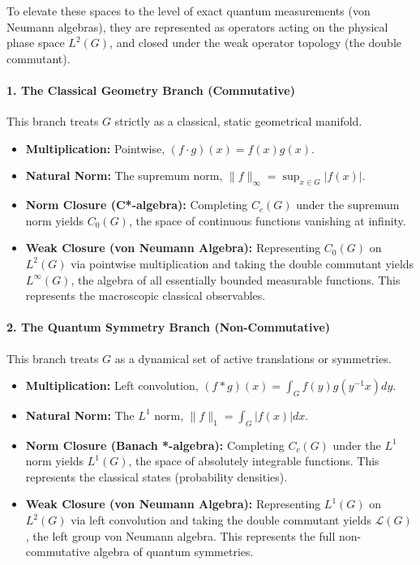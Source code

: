 \documentclass[11pt]{article}
\begin{document}
To elevate these spaces to the level of exact quantum measurements (von Neumann algebras), they are represented as operators acting on the physical phase space $L^2(G)$, and closed under the weak operator topology (the double commutant).

\paragraph{1. The Classical Geometry Branch (Commutative)}
This branch treats $G$ strictly as a classical, static geometrical manifold.
\begin{itemize}
    \item \textbf{Multiplication:} Pointwise, $(f \cdot g)(x) = f(x)g(x)$.
    \item \textbf{Natural Norm:} The supremum norm, $\|f\|_\infty = \sup_{x \in G} |f(x)|$.
    \item \textbf{Norm Closure (C*-algebra):} Completing $C_c(G)$ under the supremum norm yields $C_0(G)$, the space of continuous functions vanishing at infinity.
    \item \textbf{Weak Closure (von Neumann Algebra):} Representing $C_0(G)$ on $L^2(G)$ via pointwise multiplication and taking the double commutant yields $L^\infty(G)$, the algebra of all essentially bounded measurable functions. This represents the macroscopic classical observables.
\end{itemize}

\paragraph{2. The Quantum Symmetry Branch (Non-Commutative)}
This branch treats $G$ as a dynamical set of active translations or symmetries.
\begin{itemize}
    \item \textbf{Multiplication:} Left convolution, $(f * g)(x) = \int_G f(y)g(y^{-1}x) dy$.
    \item \textbf{Natural Norm:} The $L^1$ norm, $\|f\|_1 = \int_G |f(x)| dx$.
    \item \textbf{Norm Closure (Banach *-algebra):} Completing $C_c(G)$ under the $L^1$ norm yields $L^1(G)$, the space of absolutely integrable functions. This represents the classical states (probability densities).
    \item \textbf{Weak Closure (von Neumann Algebra):} Representing $L^1(G)$ on $L^2(G)$ via left convolution and taking the double commutant yields $\mathcal{L}(G)$, the left group von Neumann algebra. This represents the full non-commutative algebra of quantum symmetries.
\end{itemize}
\end{document}
